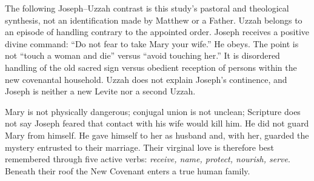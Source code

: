 The following Joseph--Uzzah contrast is this study's pastoral and theological
synthesis, not an identification made by Matthew or a Father.  Uzzah belongs
to an episode of handling contrary to the appointed order.  Joseph receives a
positive divine command: ``Do not fear to take Mary your wife.''  He obeys.
The point is not ``touch a woman and die'' versus ``avoid touching her.''  It
is disordered handling of the old sacred sign versus obedient reception of
persons within the new covenantal household.  Uzzah does not explain Joseph's
continence, and Joseph is neither a new Levite nor a second Uzzah.

Mary is not physically dangerous; conjugal union is not unclean; Scripture
does not say Joseph feared that contact with his wife would kill him.  He did
not guard Mary from himself.  He gave himself to her as husband and, with her,
guarded the mystery entrusted to their marriage.  Their virginal love is
therefore best remembered through five active verbs: \emph{receive, name,
protect, nourish, serve}.  Beneath their roof the New Covenant enters a true
human family.

